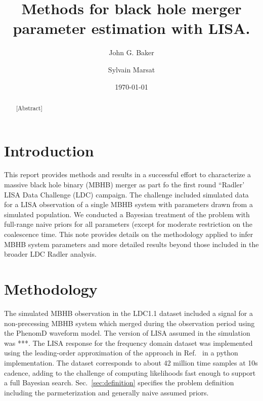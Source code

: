 \documentclass[aps,showpacs,12pt,onecolumn,prd,superscriptaddress,nofootinbib]{revtex4}
\begin{document}
\title{Methods for black hole merger parameter estimation with LISA.}

\author{John G. Baker}
\author{Sylvain Marsat}



\date{\today}

\begin{abstract}

[Abstract]

\end{abstract}


\maketitle


\section{Introduction}
\label{sec:intro}
This report provides methods and results in a successful effort to characterize a massive black hole binary (MBHB) merger as part fo the first round ``Radler' LISA Data Challenge (LDC) campaign.  The challenge included simulated data for a LISA observation of a single MBHB system with parameters drawn from a simulated population. We conducted a Bayesian treatment of the problem with full-range naive priors for all parameters (except for moderate restriction on the coalescence time. This note provides details on the methodology applied to infer MBHB system parameters and more detailed results beyond those included in the broader LDC Radler analysis.

\section{Methodology}

The simulated MBHB observation in the LDC1.1 dataset included a signal for a non-precessing MBHB system which merged during the observation period using the PhenomD waveform model. The version of LISA assumed in the simulation was ***. The LISA response for the frequency domain dataset was implemented using the leading-order approximation of the approach in Ref.~\cite{MarsatEA2018} in a python implementation.  The dataset corresponds to about 42 million time samples at 10s cadence, adding to the challenge of computing likelihoods fast enough to support a full Bayesian search. Sec.~\ref{sec:definition} specifies the problem definition including the parmeterization and generally naive assumed priors.
\end{document}
